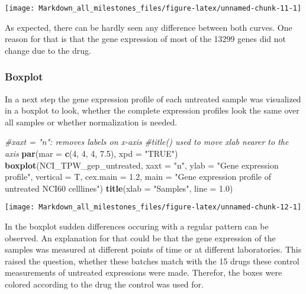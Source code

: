 \documentclass[]{article}
\newenvironment{Shaded}{\begin{snugshade}}{\end{snugshade}}
\newcommand{\CommentTok}[1]{\textcolor[rgb]{0.56,0.35,0.01}{\textit{#1}}}
\newcommand{\DataTypeTok}[1]{\textcolor[rgb]{0.13,0.29,0.53}{#1}}
\newcommand{\DecValTok}[1]{\textcolor[rgb]{0.00,0.00,0.81}{#1}}
\newcommand{\FloatTok}[1]{\textcolor[rgb]{0.00,0.00,0.81}{#1}}
\newcommand{\KeywordTok}[1]{\textcolor[rgb]{0.13,0.29,0.53}{\textbf{#1}}}
\newcommand{\NormalTok}[1]{#1}
\newcommand{\StringTok}[1]{\textcolor[rgb]{0.31,0.60,0.02}{#1}}
\begin{document}
\begin{center}\texttt{[image: Markdown\_all\_milestones\_files/figure-latex/unnamed-chunk-11-1]} \end{center}

As expected, there can be hardly seen any difference between both
curves. One reason for that is that the gene expression of most of the
13299 genes did not change due to the drug.

\hypertarget{boxplot}{%
\subsubsection{Boxplot}\label{boxplot}}

In a next step the gene expression profile of each untreated sample was
visualized in a boxplot to look, whether the complete expression
profiles look the same over all samples or whether normalization is
needed.

\begin{Shaded}
\begin{Highlighting}[]
\CommentTok{#xaxt = "n": removes labels on x-axis}
\CommentTok{#title() used to move xlab nearer to the axis}
\KeywordTok{par}\NormalTok{(}\DataTypeTok{mar =} \KeywordTok{c}\NormalTok{(}\DecValTok{4}\NormalTok{, }\DecValTok{4}\NormalTok{, }\DecValTok{4}\NormalTok{, }\FloatTok{7.5}\NormalTok{), }\DataTypeTok{xpd =} \StringTok{"TRUE"}\NormalTok{)}
\KeywordTok{boxplot}\NormalTok{(NCI_TPW_gep_untreated, }
        \DataTypeTok{xaxt =} \StringTok{"n"}\NormalTok{, }
        \DataTypeTok{ylab =} \StringTok{"Gene expression profile"}\NormalTok{, }
        \DataTypeTok{vertical =}\NormalTok{  T, }
        \DataTypeTok{cex.main =} \FloatTok{1.2}\NormalTok{,}
        \DataTypeTok{main =} \StringTok{"Gene expression profile of untreated NCI60 celllines"}\NormalTok{)}
\KeywordTok{title}\NormalTok{(}\DataTypeTok{xlab =} \StringTok{"Samples"}\NormalTok{, }\DataTypeTok{line =} \FloatTok{1.0}\NormalTok{)}
\end{Highlighting}
\end{Shaded}

\begin{center}\texttt{[image: Markdown\_all\_milestones\_files/figure-latex/unnamed-chunk-12-1]} \end{center}

In the boxplot sudden differences occuring with a regular pattern can be
observed. An explanation for that could be that the gene expression of
the samples was measured at different points of time or at different
laboratories. This raised the question, whether these batches match with
the 15 drugs these control measurements of untreated expressions were
made. Therefor, the boxes were colored according to the drug the control
was used for.
\end{document}
